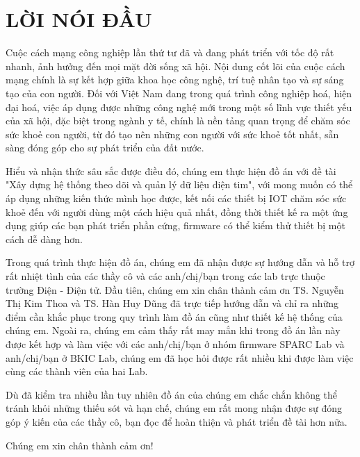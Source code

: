 \section*{LỜI NÓI ĐẦU} %
\thispagestyle{empty}

Cuộc cách mạng công nghiệp lần thứ tư đã và đang phát triển với tốc
độ rất nhanh, ảnh hưởng đến mọi mặt đời sống xã hội. Nội dung cốt lõi của cuộc cách mạng chính là sự kết hợp giữa 
khoa học công nghệ, trí tuệ nhân tạo và sự sáng tạo của con người. Đối với Việt Nam đang trong quá trình công nghiệp hoá, 
hiện đại hoá, việc áp dụng được những công nghệ mới trong một số lĩnh vực thiết yếu của xã hội, đặc biệt trong ngành y tế, 
chính là nền tảng quan trọng để chăm sóc sức khoẻ con người, từ đó tạo nên những con người với sức khoẻ tốt nhất, sẵn sàng 
đóng góp cho sự phát triển của đất nước.

Hiểu và nhận thức sâu sắc được điều đó, chúng em thực hiện đồ án với đề tài "Xây dựng hệ thống theo dõi và quản lý dữ liệu điện tim",
với mong muốn có thể áp dụng những kiến thức mình học được, kết nối các thiết bị IOT chăm sóc sức khoẻ đến với người dùng một cách
hiệu quả nhất, đồng thời thiết kế ra một ứng dụng giúp các bạn phát triển phần cứng, firmware có thể kiểm thử thiết bị
một cách dễ dàng hơn.

Trong quá trình thực hiện đồ án, chúng em đã nhận được sự hướng dẫn và hỗ trợ rất nhiệt tình của các thầy cô và các anh/chị/bạn trong
các lab trực thuộc trường Điện - Điện tử. Đầu tiên, chúng em xin chân thành cảm ơn TS. Nguyễn Thị Kim Thoa và TS. Hàn Huy Dũng đã
trực tiếp hướng dẫn và chỉ ra những điểm cần khắc phục trong quy trình làm đồ án cũng như thiết kế hệ thống của chúng em. Ngoài ra,
chúng em cảm thấy rất may mắn khi trong đồ án lần này được kết hợp và làm việc với các anh/chị/bạn ở nhóm firmware SPARC Lab và
anh/chị/bạn ở BKIC Lab, chúng em đã học hỏi được rất nhiều khi được làm việc cùng các thành viên của hai Lab.

Dù đã kiểm tra nhiều lần tuy nhiên đồ án của chúng em chắc chắn không thể tránh khỏi những thiếu sót và hạn chế, chúng em rất mong nhận được sự đóng góp ý
kiến của các thầy cô, bạn đọc để hoàn thiện và phát triển đề tài hơn nữa.

Chúng em xin chân thành cảm ơn!



\cleardoublepage
